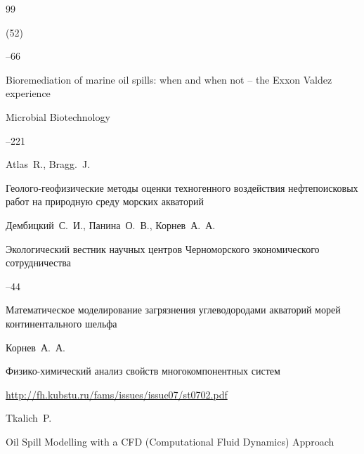 \begin{thebibliography}{99}

 (52)

--66







\paper Bioremediation of marine oil spills: when and when not -- the Exxon Valdez experience


\jour Microbial Biotechnology 



--221

\by Atlas~R., Bragg.~J.







\paper Геолого-геофизические методы оценки техногенного воздействия нефтепоисковых работ на природную среду морских акваторий

\by Дембицкий~С.~И., Панина~О.~В., Корнев~А.~А.

\jour Экологический вестник научных центров Черноморского экономического сотрудничества



--44





\paper Математическое моделирование загрязнения углеводородами акваторий морей континентального шельфа

\by Корнев~А.~А.

\jour Физико-химический анализ свойств многокомпонентных систем



\issueinfo \url{http://fh.kubstu.ru/fams/issues/issue07/st0702.pdf}






\by Tkalich~P.

\paper Oil Spill Modelling with a CFD (Computational Fluid Dynamics) Approach


\end{thebibliography}

